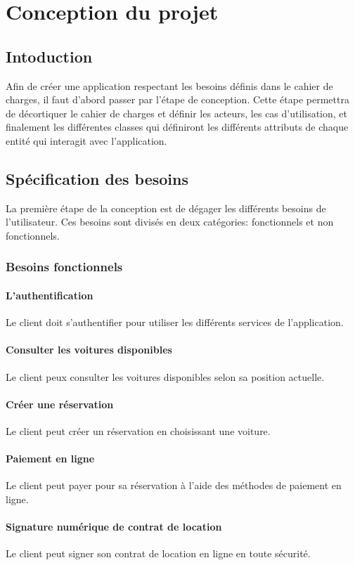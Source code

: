 \chapter{Conception du projet}
\minitoc
\clearpage
\section*{Intoduction}
Afin de créer une application respectant les besoins définis dans le cahier de charges, il faut d'abord passer par l'étape de conception. Cette étape permettra de décortiquer le cahier de charges et définir les acteurs, les cas d'utilisation, et finalement les différentes classes qui définiront les différents attributs de chaque entité qui interagit avec l'application.
\section{Spécification des besoins}
La première étape de la conception est de dégager les différents besoins de l'utilisateur. Ces besoins sont divisés en deux catégories: fonctionnels et non fonctionnels.
\subsection{Besoins fonctionnels}
\subsubsection{L'authentification}
Le client doit s'authentifier pour utiliser les différents services de l'application.
\subsubsection{Consulter les voitures disponibles}
Le client peux consulter les voitures disponibles selon sa position actuelle.
\subsubsection{Créer une réservation}
Le client peut créer un réservation en choisissant une voiture.
\subsubsection{Paiement en ligne}
Le client peut payer pour sa réservation à l'aide des méthodes de paiement en ligne.
\subsubsection{Signature numérique de contrat de location}
Le client peut signer son contrat de location en ligne en toute sécurité.
